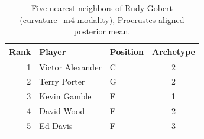 \begin{table}[htbp]
  \centering\small
  \begin{tabular}{rllc}
    \toprule
    Rank & Player & Position & Archetype \\
    \midrule
    1 & Victor Alexander & C & 2 \\
    2 & Terry Porter & G & 2 \\
    3 & Kevin Gamble & F & 1 \\
    4 & David Wood & F & 2 \\
    5 & Ed Davis & F & 3 \\
    \bottomrule
  \end{tabular}
  \caption{Five nearest neighbors of Rudy Gobert (curvature_m4 modality), Procrustes-aligned posterior mean.}
  \label{tab:Rudy_Gobert_neighbors_curvature_m4}
\end{table}

